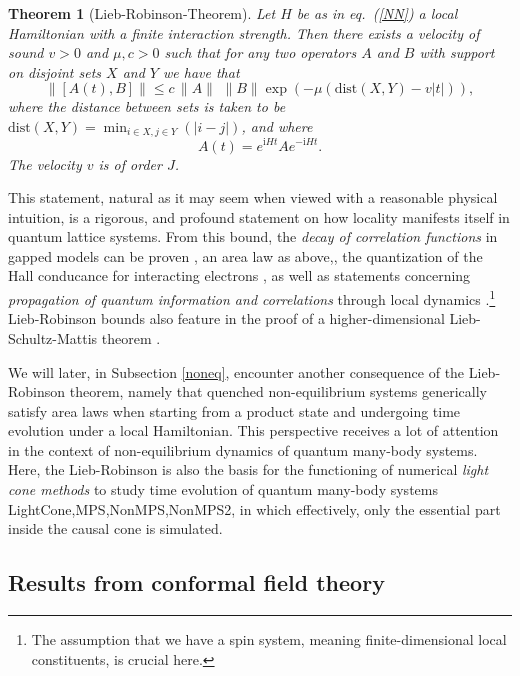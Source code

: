\documentclass[12pt, rmp,floatfix,epsfig,graphics]{revtex4} %
\newcommand{\mi}{\mathrm{i} }
\newtheorem{theorem}{Theorem}
\begin{document}
\begin{theorem}[Lieb-Robinson-Theorem]
\label{LRT}
Let $H$ be  as in eq.\ (\ref{NN}) a local Hamiltonian with
a finite interaction strength. Then there exists a velocity 
of sound $v>0$ and $\mu, c>0$ such that for any two 
operators $A$ and $B$ with support on disjoint sets $X$ and 
$Y$ we have that
\begin{equation}
        \label{lrb}
        \| [A(t),B]\| \leq
        c  \, \| A \|\,\, \| B  \|
        \exp\left(-\mu ({\text{dist}}(X,Y)-v|t| )\right),
\end{equation}
where the distance between sets is taken to be
${\text{dist}}(X,Y)=\min_{i\in X,j\in Y}(|i-j|)$, 
and where 
\begin{equation*}
        A(t)=e^{ \mi H t} A e^{-\mi H t}.
\end{equation*}
The velocity $v$ is of order $J$.
\end{theorem}

This statement, natural as it may seem when viewed with 
a reasonable physical intuition, is a rigorous, and profound 
statement on how locality manifests itself in quantum 
lattice systems. From this bound, the {\it decay of 
correlation functions} in gapped models can be proven \cite{Decay,Decay2},
an area law as above,\cite{OneD}, 
the quantization of the Hall conducance for interacting electrons \cite{Michalakis},
as well as statements concerning {\it propagation of 
quantum information and correlations} through local 
dynamics \cite{Quench2}.\footnote{The assumption that
we have a spin system, meaning finite-dimensional local 
constituents, is crucial here.} Lieb-Robinson bounds 
also feature in the proof of a higher-dimensional 
Lieb-Schultz-Mattis theorem \cite{LSM2,LSM3}.

We will later, in Subsection \ref{noneq}, encounter 
another consequence 
of the Lieb-Robinson theorem, namely that quenched 
non-equilibrium systems generically satisfy area laws when
starting from a product state and undergoing time evolution under
a local Hamiltonian. This perspective receives a  lot of attention
in the context of non-equilibrium dynamics of quantum many-body
systems. Here, the Lieb-Robinson is also the basis for the functioning
of numerical  {\it light cone methods} to study time evolution of 
quantum many-body systems {LightCone,MPS,NonMPS,NonMPS2},
in which effectively, only the essential part inside the causal cone 
is simulated.

\subsection{Results from conformal field theory}
\end{document}
